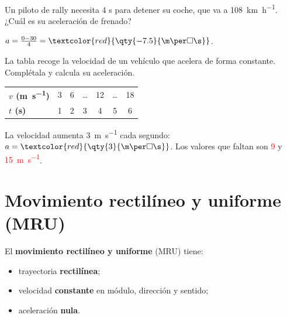 \begin{exercise}
    Un piloto de rally necesita 4 s para detener su coche, que va a \qty{108}{\km\per\hour}. ¿Cuál es su aceleración de frenado?
    \begin{solu}
        \(a = \frac{0 - 30}{4} = \textcolor{red}{\qty{-7.5}{\m\per\square\s}}\).
    \end{solu}
\end{exercise}

\begin{exercise}
    La tabla recoge la velocidad de un vehículo que acelera de forma constante. Complétala y calcula su aceleración.
    \begin{center}
        \begin{tabular}{@{}lcccccc@{}}
            \toprule
            \textbf{\(v\) (\unit{\m\per\s})} & 3 & 6 & \ldots & 12 & \ldots & 18 \\[3pt]
            \textbf{\(t\) (\unit{\s})} & 1 & 2 & 3 & 4 & 5 & 6 \\
            \bottomrule
        \end{tabular}
    \end{center}
    \begin{solu}
        La velocidad aumenta \qty{3}{\m\per\s} cada segundo: \(a = \textcolor{red}{\qty{3}{\m\per\square\s}}\). Los valores que faltan son \textcolor{red}{9} y \textcolor{red}{\qty{15}{\m\per\s}}.
    \end{solu}
\end{exercise}

\section{Movimiento rectilíneo y uniforme (MRU)}

El \textbf{movimiento rectilíneo y uniforme} (MRU) tiene:
\begin{itemize}
    \item trayectoria \textbf{rectilínea};
    \item velocidad \textbf{constante} en módulo, dirección y sentido;
    \item aceleración \textbf{nula}.
\end{itemize}

